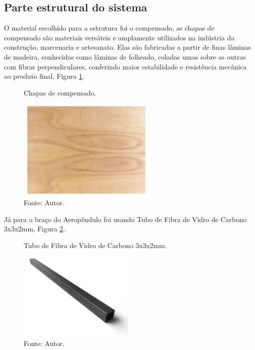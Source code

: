 \subsection{ Parte estrutural do sistema}

 O material escolhido para a estrutura foi o compensado, as chapas de compensado são materiais versáteis e amplamente utilizados na indústria da construção, marcenaria e artesanato. Elas são fabricadas a partir de finas lâminas de madeira, conhecidas como lâminas de folheado, coladas umas sobre as outras com fibras perpendiculares, conferindo maior estabilidade e resistência mecânica ao produto final, Figura \ref{fig3:image_02}.

\begin{figure}[!h]
	\centering
	\caption{Chapas de compensado.}
	\includegraphics[width=0.6\textwidth]{Capitulos/3_simulacao_e_prototipo/3_figuras/compensado.pdf}
	\caption*{Fonte: Autor.}
	\label{fig3:image_02}
\end{figure}



 Já para o braço do Aeropêndulo foi usando Tubo de Fibra de Vidro de Carbono 3x3x2mm, Figura \ref{fig3:image_03}.

\begin{figure}[!h]
	\centering
	\caption{Tubo de Fibra de Vidro de Carbono 3x3x2mm.}
	\includegraphics[width=0.5\textwidth]{Capitulos/3_simulacao_e_prototipo/3_figuras/carbono2x2mm.pdf}
	\caption*{Fonte: Autor.}
	\label{fig3:image_03}
\end{figure}


